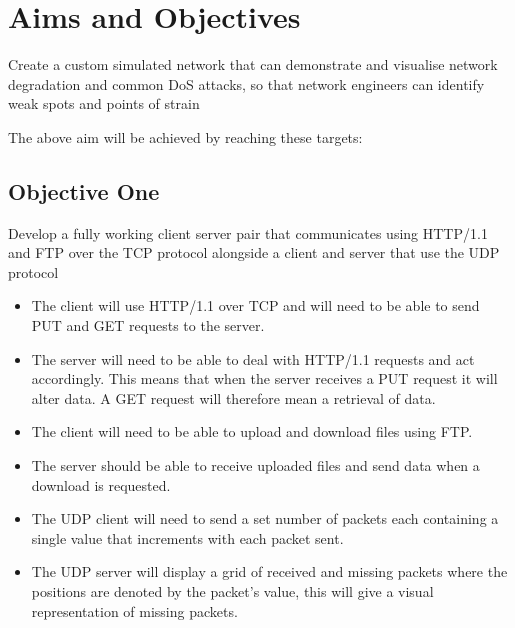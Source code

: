 \chapter{Aims and Objectives}
\begin{center}
Create a custom simulated network that can demonstrate and visualise network degradation and common DoS attacks, so that network engineers can identify weak spots and points of strain
\end{center}


The above aim will be achieved by reaching these targets:

\section{Objective One}
\label{ref:obj1}
Develop a fully working client server pair that communicates using HTTP/1.1 \citep{HTTP} and FTP \citep{FTP} over the TCP protocol alongside a client and server that use the UDP protocol

\begin{itemize}
\item The client will use HTTP/1.1  over TCP and will need to be able to send PUT and GET requests to the server.
\item The server will need to be able to deal with HTTP/1.1 requests and act accordingly. This means that when the server receives a PUT request it will alter data. A GET request will therefore mean a retrieval of data. 
\item The client will need to be able to upload and download files using FTP.
\item The server should be able to receive uploaded files and send data when a download is requested.
\item The UDP client will need to send a set number of packets each containing a single value that increments with each packet sent.
\item The UDP server will display a grid of received and missing packets where the positions are denoted by the packet's value, this will give a visual representation of missing packets.
\end{itemize}  

